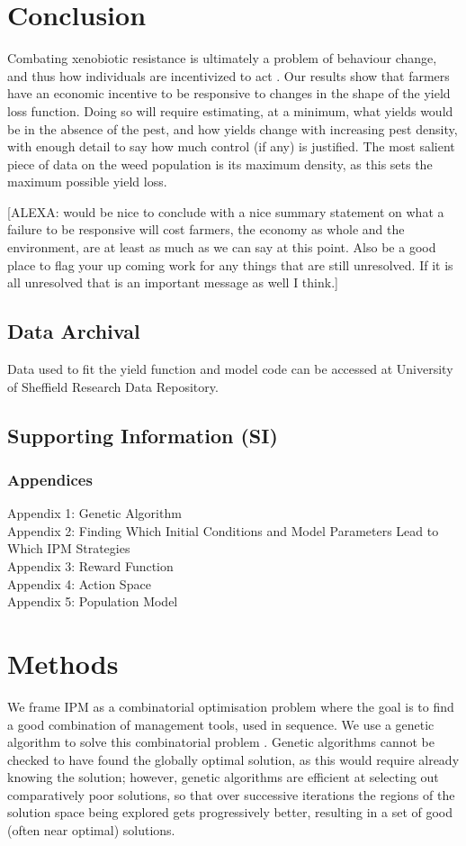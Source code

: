 \documentclass[12pt, a4paper]{article}
\begin{document}
\section*{Conclusion}
Combating xenobiotic resistance is ultimately a problem of behaviour change, and thus how individuals are incentivized to act \citep{Hurl2016}. Our results show that farmers have an economic incentive to be responsive to changes in the shape of the yield loss function. Doing so will require estimating, at a minimum, what yields would be in the absence of the pest, and how yields change with increasing pest density, with enough detail to say how much control (if any) is justified. The most salient piece of data on the weed population is its maximum density, as this sets the maximum possible yield loss.      

[ALEXA: would be nice to conclude with a nice summary statement on what a failure to be responsive will cost farmers, the economy as whole and the environment, are at least as much as we can say at this point. Also be a good place to flag your up coming work for any things that are still unresolved. If it is all unresolved that is an important message as well I think.] 

\subsection*{Data Archival}

Data used to fit the yield function and model code can be accessed at University of Sheffield Research Data Repository.

\subsection*{Supporting Information (SI)}
\subsubsection*{Appendices}
Appendix 1: Genetic Algorithm\\
Appendix 2: Finding Which Initial Conditions and Model Parameters Lead to Which IPM Strategies\\
Appendix 3: Reward Function\\
Appendix 4: Action Space\\
Appendix 5: Population Model\\

\section*{Methods}
We frame IPM as a combinatorial optimisation problem where the goal is to find a good combination of management tools, used in sequence. We use a genetic algorithm to solve this combinatorial problem \citep{Tayl2004GA, Carr2010}. Genetic algorithms cannot be checked to have found the globally optimal solution, as this would require already knowing the solution; however, genetic algorithms are efficient at selecting out comparatively poor solutions, so that over successive iterations the regions of the solution space being explored gets progressively better, resulting in a set of good (often near optimal) solutions.
\end{document}
